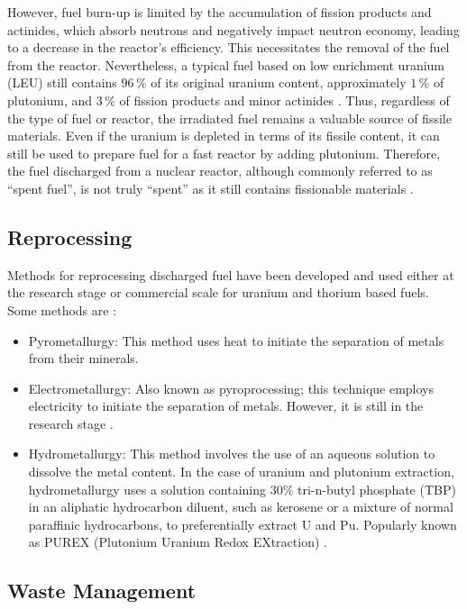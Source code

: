 However, fuel burn-up is limited by the accumulation of fission products and actinides, which absorb neutrons and negatively impact neutron economy, leading to a decrease in the reactor's efficiency. This necessitates the removal of the fuel from the reactor. Nevertheless, a typical fuel based on low enrichment uranium (LEU) still contains \(96 \, \%\) of its original uranium content, approximately \(1 \, \%\) of plutonium, and \(3 \, \%\) of fission products and minor actinides \cite{fuel_cycle_book}. Thus, regardless of the type of fuel or reactor, the irradiated fuel remains a valuable source of fissile materials. Even if the uranium is depleted in terms of its fissile content, it can still be used to prepare fuel for a fast reactor by adding plutonium. Therefore, the fuel discharged from a nuclear reactor, although commonly referred to as ``spent fuel'', is not truly ``spent'' as it still contains fissionable materials \cite{fuel_cycle_book}. 

\subsection{Reprocessing}

Methods for reprocessing discharged fuel have been developed and used either at the research stage or commercial scale for uranium and thorium based fuels. Some methods are \cite{Th_cycle_viability}:

\begin{itemize}
    \item Pyrometallurgy: This method uses heat to initiate the separation of metals from their minerals. 
    \item Electrometallurgy: Also known as pyroprocessing; this technique employs electricity to initiate the separation of metals. However, it is still in the research stage \cite{Th_cycle_viability}.
    \item Hydrometallurgy: This method involves the use of an aqueous solution to dissolve the metal content. In the case of uranium and plutonium extraction, hydrometallurgy uses a solution containing \(30\%\) tri-n-butyl phosphate (TBP) in an aliphatic hydrocarbon diluent, such as kerosene or a mixture of normal paraffinic hydrocarbons, to preferentially extract U and Pu. Popularly known as PUREX (Plutonium Uranium Redox EXtraction) \cite{fuel_cycle_book}.
\end{itemize}

\subsection{Waste Management}

